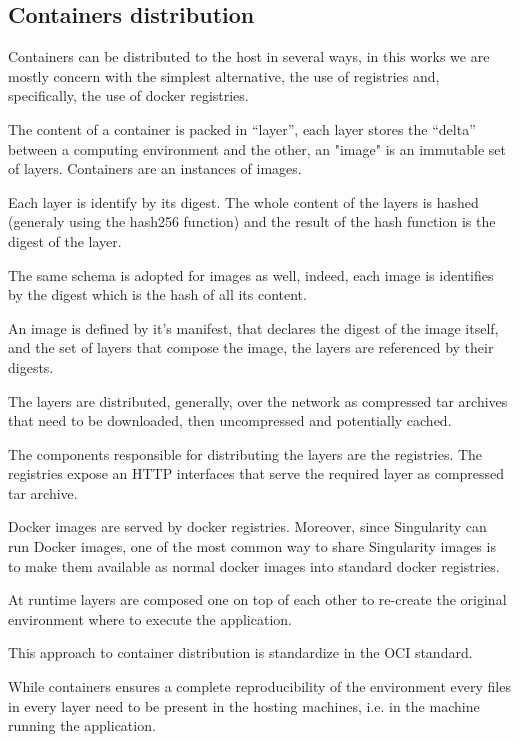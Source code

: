 \subsection{Containers distribution}
\label{subsec:singularity-docker-distribution}

Containers can be distributed to the host in several ways, in this works we are
mostly concern with the simplest alternative, the use of registries and,
specifically, the use of docker registries.

The content of a container is packed in “layer”, each layer stores the “delta”
between a computing environment and the other, an "image" is an immutable set
of layers. Containers are an instances of images.

Each layer is identify by its digest. The whole content of the layers is hashed
(generaly using the hash256 function) and the result of the hash function is
the digest of the layer.

The same schema is adopted for images as well, indeed, each image is identifies
by the digest which is the hash of all its content.

An image is defined by it's manifest, that declares the digest of the image
itself, and the set of layers that compose the image, the layers are referenced
by their digests.

The layers are distributed, generally, over the network as compressed tar
archives that need to be downloaded, then uncompressed and potentially cached.

The components responsible for distributing the layers are the registries. The
registries expose an HTTP interfaces that serve the required layer as
compressed tar archive.

Docker images are served by docker registries. Moreover, since Singularity can
run Docker images, one of the most common way to share Singularity images is to
make them available as normal docker images into standard docker registries. 

At runtime layers are composed one on top of each other to re-create the
original environment where to execute the application.

This approach to container distribution is standardize in the OCI standard.

While containers ensures a complete reproducibility of the environment every
files in every layer need to be present in the hosting machines, i.e. in the
machine running the application.


